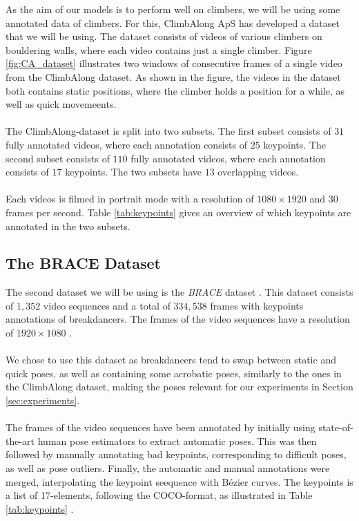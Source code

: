 \documentclass[./main.tex]{subfiles}
\begin{document}
As the aim of our models is to perform well on climbers, we will be using some annotated data of climbers. For this, ClimbAlong ApS has developed a dataset that we will be using. The dataset consists of videos of various climbers on bouldering walls, where each video contains just a single climber. Figure \ref{fig:CA_dataset} illustrates two windows of consecutive frames of a single video from the ClimbAlong dataset. As shown in the figure, the videos in the dataset both contains static positions, where the climber holds a position for a while, as well as quick movemeents.
\\
\\
The ClimbAlong-dataset is split into two subsets. The first subset consists of $31$ fully annotated videos, where each annotation consists of $25$ keypoints. The second subset consists of $110$ fully annotated videos, where each annotation consists of $17$ keypoints. The two subsets have $13$ overlapping videos.
\\
\\
Each videos is filmed in portrait mode with a resolution of $1080 \times 1920$ and $30$ frames per second. Table \ref{tab:keypoints} gives an overview of which keypoints are annotated in the two subsets. 

\subsection{The BRACE Dataset}
The second dataset we will be using is the \textit{BRACE} dataset \cite{BRACE}. This dataset consists of $1,352$ video sequences and a total of $334,538$ frames with keypoints annotations of breakdancers. The frames of the video sequences have a resolution of $1920 \times 1080$ \cite{BRACE}.
\\
\\
We chose to use this dataset as breakdancers tend to swap between static and quick poses, as well as containing some acrobatic poses, similarly to the ones in the ClimbAlong dataset, making the poses relevant for our experiments in Section \ref{sec:experiments}.
\\
\\
The frames of the video sequences have been annotated by initially using state-of-the-art human pose estimators to extract automatic poses. This was then followed by manually annotating bad keypoints, corresponding to difficult poses, as well as pose outliers. Finally, the automatic and manual annotations were merged, interpolating the keypoint seequence with Bézier curves. The keypoints is a list of 17-elements, following the COCO-format, as illustrated in Table \ref{tab:keypoints} \cite{BRACE}.
\end{document}
